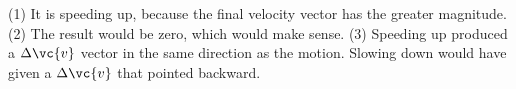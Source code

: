 (1) It is speeding up, because the final velocity vector has the
 greater magnitude. (2) The result would be zero,
which would make sense. (3) Speeding up produced a $\Delta\vc{v}$
vector in the same direction as the motion. Slowing
down would have given a $\Delta\vc{v}$ that pointed backward.



